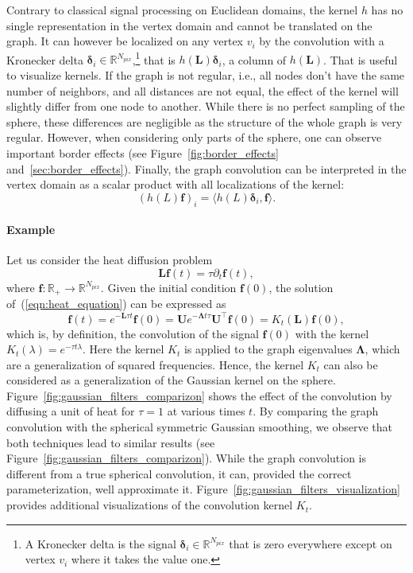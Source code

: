 \documentclass[final,twocolumn,3p,times,authoryear]{elsarticle}
\newcommand{\figref}[1]{Figure~\ref{fig:#1}}
\newcommand{\eqnref}[1]{(\ref{eqn:#1})}
\renewcommand{\b}[1]{{\bm{#1}}}   %
\newcommand{\1}{\b{1}}              %
\newcommand{\0}{\b{0}}              %
\newcommand{\g}[1]{\b{#1}}
\renewcommand{\L}{\b{L}}
\newcommand{\U}{\b{U}}
\newcommand{\f}{\b{f}}
\newcommand{\trans}{^\intercal}
\newcommand{\R}{\mathbb{R}}
\newcommand{\bLambda}{\b{\Lambda}}
\begin{document}
Contrary to classical signal processing on Euclidean domains, the kernel $h$ has no single representation in the vertex domain and cannot be translated on the graph. It can however be localized on any vertex $v_i$ by the convolution with a Kronecker delta $\b \delta_i \in \R^{N_{pix}}$,\footnote{A Kronecker delta is the signal $\b \delta_i \in \R^{N_{pix}}$ that is zero everywhere except on vertex $v_i$ where it takes the value one.} that is $h(\L) \b \delta_i$, a column of $h(\L)$.
That is useful to visualize kernels.
If the graph is not regular, i.e., all nodes don't have the same number of neighbors, and all distances are not equal, the effect of the kernel will slightly differ from one node to another. While there is no perfect sampling of the sphere, these differences are negligible as the structure of the whole graph is very regular. However, when considering only parts of the sphere, one can observe important border effects (see \figref{border_effects} and~\ref{sec:border_effects}).
Finally, the graph convolution can be interpreted in the vertex domain as a scalar product with all localizations of the kernel:
\begin{equation*}
	(h(L) \f)_i = \langle h(L) \b \delta_i, \f \rangle.
\end{equation*}

\paragraph{Example}
Let us consider the heat diffusion problem
\begin{equation} \label{eqn:heat_equation}
	\L \b{f}(t) = \tau \partial_t \b{f}(t),
\end{equation}
where $\b{f}: \R_+ \rightarrow \R^{N_{pix}}$. Given the initial condition
$\b{f}(0)$, the solution of~\eqnref{heat_equation} can be expressed as
\begin{equation*}
	\b{f}(t) = e^{-\L \tau t} \b{f}(0) = \U e^{-\bLambda t \tau} \U\trans \g{f}(0) = K_t(\L) \b{f}(0),
\end{equation*}
which is, by definition, the convolution of the signal $\b{f}(0)$ with the kernel $K_t(\lambda)=e^{-\tau t \lambda}$. Here the kernel $K_t$ is applied to the graph eigenvalues $\bLambda$, which are a generalization of squared frequencies. Hence, the kernel $K_t$ can also be considered as a generalization of the Gaussian kernel on the sphere. \figref{gaussian_filters_comparizon} shows the effect of the convolution by diffusing a unit of heat for $\tau=1$ at various times $t$. By comparing the graph convolution with the spherical symmetric Gaussian smoothing, we observe that both techniques lead to similar results (see \figref{gaussian_filters_comparizon}). While the graph convolution is different from a true spherical convolution, it can, provided the correct parameterization, well approximate it. \figref{gaussian_filters_visualization} provides additional visualizations of the convolution kernel $K_t$.
\end{document}
